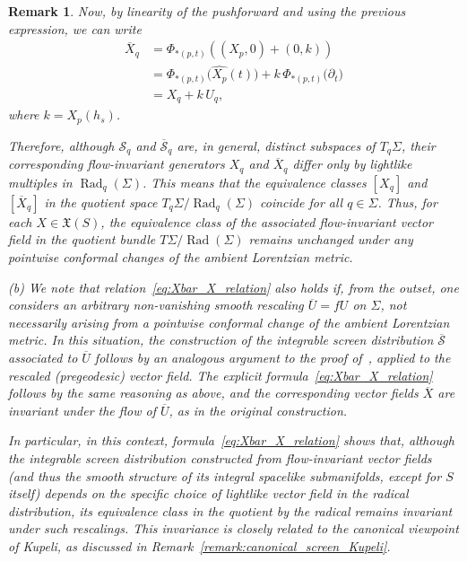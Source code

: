 \documentclass[11pt]{article}
\numberwithin{equation}{section}
\newtheorem{remark}[theorem]{Remark}
\begin{document}
\begin{remark}
Now, by linearity of the pushforward and using the previous expression, we can write
\begin{align}
	\overline{X}_q &= \Phi_{*(p, t)}\left((X_p, 0) + (0, k)\right) \nonumber \\
	&= \Phi_{*(p, t)}\bigl(\widehat{X_p}(t)\bigr) + k\, \Phi_{*(p, t)}\bigl(\partial_t\bigr) \nonumber \\
	&= X_q + k\, U_q, \label{eq:Xbar_X_relation}
\end{align}
where $k = X_p(h_s)$. 
	
Therefore, although $\mathcal{S}_q$ and $\overline{\mathcal{S}}_q$ are, in general, distinct subspaces of $T_q\Sigma$, their corresponding flow-invariant generators $X_q$ and $\overline{X}_q$ differ only by lightlike multiples in $\operatorname{Rad}_q(\Sigma)$. This means that the equivalence classes $[X_q]$ and $[\overline{X}_q]$ in the quotient space $T_q\Sigma / \operatorname{Rad}_q(\Sigma)$ coincide for all $q \in \Sigma$. Thus, for each \( X \in \mathfrak{X}(S) \), the equivalence class of the associated flow-invariant vector field in the quotient bundle \( T\Sigma / \operatorname{Rad}(\Sigma) \) remains unchanged under any pointwise conformal changes of the ambient Lorentzian metric.
	
	
		
(b) We note that relation~\eqref{eq:Xbar_X_relation} also holds if, from the outset, one considers an arbitrary non-vanishing smooth rescaling $\overline{U} = fU$ on $\Sigma$, not necessarily arising from a pointwise conformal change of the ambient Lorentzian metric. In this situation, the construction of the integrable screen distribution $\overline{\mathcal{S}}$ associated to $\overline{U}$ follows by an analogous argument to the proof of~, applied to the rescaled (pregeodesic) vector field. The explicit formula~\eqref{eq:Xbar_X_relation} follows by the same reasoning as above, and the corresponding vector fields $\overline{X}$ are invariant under the flow of $\overline{U}$, as in the original construction.

In particular, in this context, formula~\eqref{eq:Xbar_X_relation} shows that, although the integrable screen distribution constructed from flow-invariant vector fields (and thus the smooth structure of its integral spacelike submanifolds, except for $S$ itself) depends on the specific choice of lightlike vector field in the radical distribution, its equivalence class in the quotient by the radical remains invariant under such rescalings. This invariance is closely related to the canonical viewpoint of Kupeli, as discussed in Remark~\ref{remark:canonical_screen_Kupeli}.
	\end{remark}
	
\end{document}
